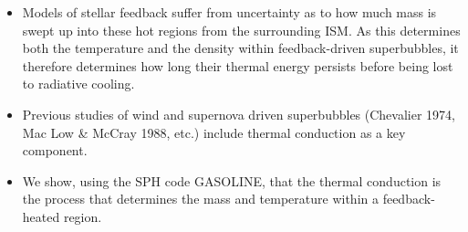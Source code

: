 \documentclass{report}
\begin{document}
\fontsize{30pt}{1em}\selectfont
\begin{itemize}
	\setlength{\itemindent}{0em}
	\item Models of stellar feedback suffer from uncertainty as to how much mass is
	swept up into these hot regions from the surrounding ISM.  As this
	determines both the temperature and the density within feedback-driven
	superbubbles, it therefore determines how long their thermal energy persists
	before being lost to radiative cooling.
	\item Previous studies of wind and supernova driven superbubbles (Chevalier 1974, Mac Low
	\& McCray 1988, etc.) include thermal conduction as a key component.
	\item We show, using the SPH code GASOLINE, that the thermal conduction is the process that determines the mass
	and temperature within a feedback-heated region.
\end{itemize}
\end{document}
